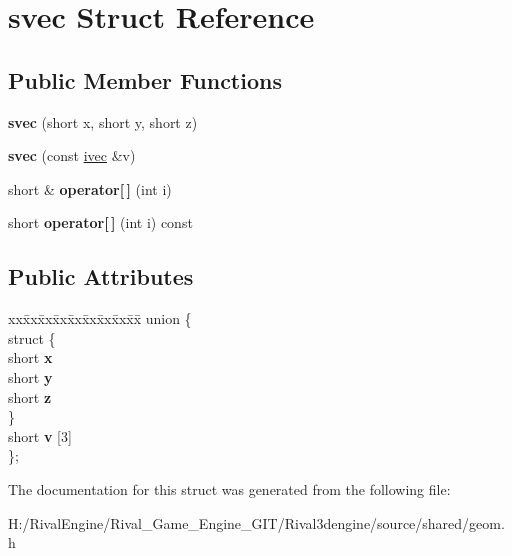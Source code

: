 \hypertarget{structsvec}{}\section{svec Struct Reference}
\label{structsvec}
\subsection*{Public Member Functions}
\begin{DoxyCompactItemize}
\item 
\mbox{\label{structsvec_ad5e8a58e88f0ceca0720cbb70de6310a}} 
{\bfseries svec} (short x, short y, short z)
\item 
\mbox{\label{structsvec_a7e4e7ba6f2594a6ee44d8f310892ec41}} 
{\bfseries svec} (const \hyperlink{structivec}{ivec} \&v)
\item 
\mbox{\label{structsvec_a35ff48175252ea71e9e8375dfb610bc5}} 
short \& {\bfseries operator\mbox{[}$\,$\mbox{]}} (int i)
\item 
\mbox{\label{structsvec_a3ee45e5dfd4e4c3a4e8b53582bb039ac}} 
short {\bfseries operator\mbox{[}$\,$\mbox{]}} (int i) const
\end{DoxyCompactItemize}
\subsection*{Public Attributes}
\begin{DoxyCompactItemize}
\item 
\mbox{\label{structsvec_a4df60afed6e1cb77c2e25205ac6206e9}} 
\begin{tabbing}
xx\=xx\=xx\=xx\=xx\=xx\=xx\=xx\=xx\=\kill
union \{\\
\mbox{\label{unionsvec_1_1_0D217_adad6bf9f0918c8ca557a3b18613cf57a}} 
\>struct \{\\
\>\>short {\bfseries x}\\
\>\>short {\bfseries y}\\
\>\>short {\bfseries z}\\
\>\} \\
\>short {\bfseries v} \mbox{[}3\mbox{]}\\
\}; \\

\end{tabbing}\end{DoxyCompactItemize}


The documentation for this struct was generated from the following file\+:\begin{DoxyCompactItemize}
\item 
H\+:/\+Rival\+Engine/\+Rival\+\_\+\+Game\+\_\+\+Engine\+\_\+\+G\+I\+T/\+Rival3dengine/source/shared/geom.\+h\end{DoxyCompactItemize}

